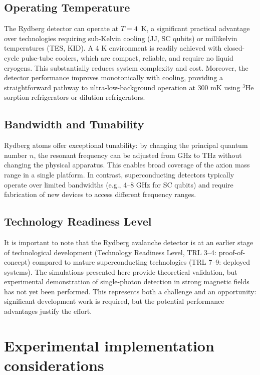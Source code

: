 \subsection*{Operating Temperature}

The Rydberg detector can operate at $T = 4$~K, a significant practical advantage over technologies requiring sub-Kelvin cooling (JJ, SC qubits) or millikelvin temperatures (TES, KID). A 4 K environment is readily achieved with closed-cycle pulse-tube coolers, which are compact, reliable, and require no liquid cryogens. This substantially reduces system complexity and cost. Moreover, the detector performance improves monotonically with cooling, providing a straightforward pathway to ultra-low-background operation at 300 mK using $^3$He sorption refrigerators or dilution refrigerators.

\subsection*{Bandwidth and Tunability}

Rydberg atoms offer exceptional tunability: by changing the principal quantum number $n$, the resonant frequency can be adjusted from GHz to THz without changing the physical apparatus. This enables broad coverage of the axion mass range in a single platform. In contrast, superconducting detectors typically operate over limited bandwidths (e.g., 4--8 GHz for SC qubits) and require fabrication of new devices to access different frequency ranges.

\subsection*{Technology Readiness Level}

It is important to note that the Rydberg avalanche detector is at an earlier stage of technological development (Technology Readiness Level, TRL 3--4: proof-of-concept) compared to mature superconducting technologies (TRL 7--9: deployed systems). The simulations presented here provide theoretical validation, but experimental demonstration of single-photon detection in strong magnetic fields has not yet been performed. This represents both a challenge and an opportunity: significant development work is required, but the potential performance advantages justify the effort.

\section{Experimental implementation considerations}
\label{sec:axion_discussion}


